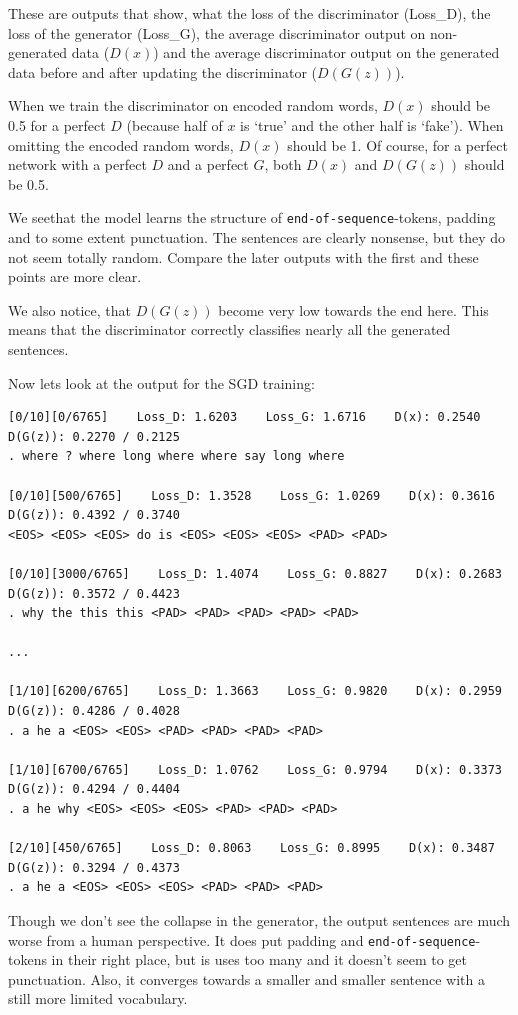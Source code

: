 \documentclass{article}
\begin{document}
These are outputs that show, what the loss of the discriminator (Loss\_D), the
loss of the generator (Loss\_G), the average discriminator output on
non-generated data ($D(x)$) and the average discriminator output on the
generated data before and after updating the discriminator ($D(G(z))$).

When we train the discriminator on encoded random words, $D(x)$ should be 0.5
for a perfect $D$ (because half of $x$ is `true' and the other half is `fake').
When omitting the encoded random words, $D(x)$ should be 1. Of course, for a
perfect network with a perfect $D$ and a perfect $G$, both $D(x)$ and $D(G(z))$
should be 0.5.

We seethat the model learns the structure of \texttt{end-of-sequence}-tokens,
padding and to some extent punctuation. The sentences are clearly nonsense, but
they do not seem totally random. Compare the later outputs with the first and
these points are more clear.

We also notice, that $D(G(z))$ become very low towards the end here. This means
that the discriminator correctly classifies nearly all the generated sentences. 

Now lets look at the output for the SGD training:

\begin{verbatim}
[0/10][0/6765]    Loss_D: 1.6203    Loss_G: 1.6716    D(x): 0.2540    D(G(z)): 0.2270 / 0.2125
. where ? where long where where say long where

[0/10][500/6765]    Loss_D: 1.3528    Loss_G: 1.0269    D(x): 0.3616    D(G(z)): 0.4392 / 0.3740
<EOS> <EOS> <EOS> do is <EOS> <EOS> <EOS> <PAD> <PAD>

[0/10][3000/6765]    Loss_D: 1.4074    Loss_G: 0.8827    D(x): 0.2683    D(G(z)): 0.3572 / 0.4423
. why the this this <PAD> <PAD> <PAD> <PAD> <PAD>

...

[1/10][6200/6765]    Loss_D: 1.3663    Loss_G: 0.9820    D(x): 0.2959    D(G(z)): 0.4286 / 0.4028
. a he a <EOS> <EOS> <PAD> <PAD> <PAD> <PAD>

[1/10][6700/6765]    Loss_D: 1.0762    Loss_G: 0.9794    D(x): 0.3373    D(G(z)): 0.4294 / 0.4404
. a he why <EOS> <EOS> <EOS> <PAD> <PAD> <PAD>

[2/10][450/6765]    Loss_D: 0.8063    Loss_G: 0.8995    D(x): 0.3487    D(G(z)): 0.3294 / 0.4373
. a he a <EOS> <EOS> <EOS> <PAD> <PAD> <PAD>
\end{verbatim}

Though we don't see the collapse in the generator, the output sentences are much
worse from a human perspective. It does put padding and
\texttt{end-of-sequence}-tokens in their right place, but is uses too many and
it doesn't seem to get punctuation. Also, it converges towards a smaller and
smaller sentence with a still more limited vocabulary.
\end{document}
